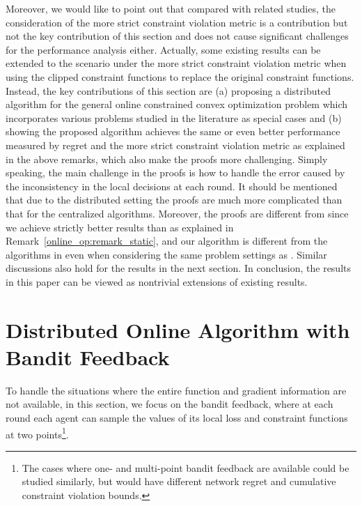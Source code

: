 \documentclass[12pt,draftcls,onecolumn]{IEEEtran}%
\begin{document}
Moreover, we would like to point out that compared with related studies, the consideration of the more strict constraint violation metric is a contribution but not the key contribution of this section and does not cause significant challenges for the performance analysis either. Actually, some existing results can be extended to the scenario under the more strict constraint violation metric when using the clipped constraint functions to replace the original constraint functions.  
Instead, the key contributions of this section are (a) proposing a distributed algorithm for the general online constrained convex optimization problem which incorporates various problems studied in the literature as special cases and (b) showing the proposed algorithm achieves the same or even better performance measured by regret and the more strict constraint violation metric as explained in the above remarks, which also make the proofs more challenging. Simply speaking, the main challenge in the proofs is how to handle the error caused by the inconsistency in the local decisions at each round. It should be mentioned that due to the distributed setting the proofs are much more complicated than that for the centralized algorithms. Moreover, the proofs are different from \cite{yuan2017adaptive,yuan2021distributed,yuan2021distributedb} since we achieve strictly better results than \cite{yuan2017adaptive} as explained in Remark~\ref{online_op:remark_static}, and our algorithm is different from the algorithms in \cite{yuan2021distributed,yuan2021distributedb} even when considering the same problem settings as \cite{yuan2021distributed,yuan2021distributedb}. Similar discussions also hold for the results in the next section. In conclusion, the results in this paper can be viewed as nontrivial extensions of existing results.




\section{Distributed Online Algorithm with Bandit Feedback}\label{online_opsec:algorithm_bandit}

To handle the situations where the entire function and gradient information are not available, in this section, we focus on the bandit feedback, where at each round each agent can sample the values of its local loss and constraint functions at two points\footnote{The cases where one- and multi-point bandit feedback are available could be studied similarly, but would have different network regret and cumulative constraint violation bounds.}.
\end{document}
